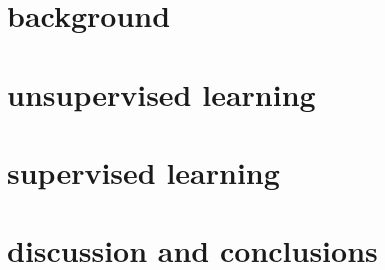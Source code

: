 \documentclass[\classfontsize,\papersize,twoside,showtrims,extrafontsizes]{memoir}  %
\begin{document}
\prefrontmatter

\cleartoevenpage

\cleartooddpage

\cleartoevenpage

\frontmatter








\glsaddall{}
\clearforchapter
\printnoidxglossary[title=Acronyms, toctitle=acronyms, type=\acronymtype]
\clearforchapter
\printnoidxglossary[title=Glossary, toctitle=glossary]

\clearforchapter
\printnomenclature

\clearforchapter
\listoffigures*
{}

\clearforchapter
\listoftables*
{}

\clearforchapter
\tableofcontents*

\clearforchapter
\mylistoftodos

\mainmatter

\part[background]{background}\label{part:background}




\part[unsupervised learning]{unsupervised learning}\label{part:unsupervised-learning}



\part[supervised learning]{supervised learning}\label{part:supervised-learning}

\part[discussion and conclusions]{discussion and conclusions}\label{part:discussion-and-conclusion}


\end{document}
